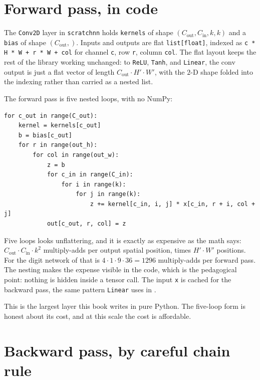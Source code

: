 
\section{Forward pass, in code}\label{sec:conv-forward}

The \texttt{Conv2D} layer in \texttt{scratchnn} holds \texttt{kernels} of
shape $(C_{\text{out}}, C_{\text{in}}, k, k)$ and a \texttt{bias} of shape
$(C_{\text{out}},)$. Inputs and outputs are flat \texttt{list[float]},
indexed as \texttt{c * H * W + r * W + col} for channel \texttt{c}, row
\texttt{r}, column \texttt{col}. The flat layout keeps the rest of the
library working unchanged: to \texttt{ReLU}, \texttt{Tanh}, and
\texttt{Linear}, the conv output is just a flat vector of length
$C_{\text{out}} \cdot H' \cdot W'$, with the $2$-D shape folded into the
indexing rather than carried as a nested list.

The forward pass is five nested loops, with no NumPy:
\begin{lstlisting}
for c_out in range(C_out):
    kernel = kernels[c_out]
    b = bias[c_out]
    for r in range(out_h):
        for col in range(out_w):
            z = b
            for c_in in range(C_in):
                for i in range(k):
                    for j in range(k):
                        z += kernel[c_in, i, j] * x[c_in, r + i, col + j]
            out[c_out, r, col] = z
\end{lstlisting}
Five loops looks unflattering, and it is exactly as expensive as the math
says: $C_{\text{out}} \cdot C_{\text{in}} \cdot k^2$ multiply-adds per output
spatial position, times $H' \cdot W'$ positions. For the digit network of
 that is $4 \cdot 1 \cdot 9 \cdot 36 = 1296$
multiply-adds per forward pass. The nesting makes the expense visible in the
code, which is the pedagogical point: nothing is hidden inside a tensor
call. The input \texttt{x} is cached for the backward pass, the same pattern
\texttt{Linear} uses in .

This is the largest layer this book writes in pure Python. The five-loop form
is honest about its cost, and at this scale the cost is affordable.

\section{Backward pass, by careful chain rule}\label{sec:conv-backward}

